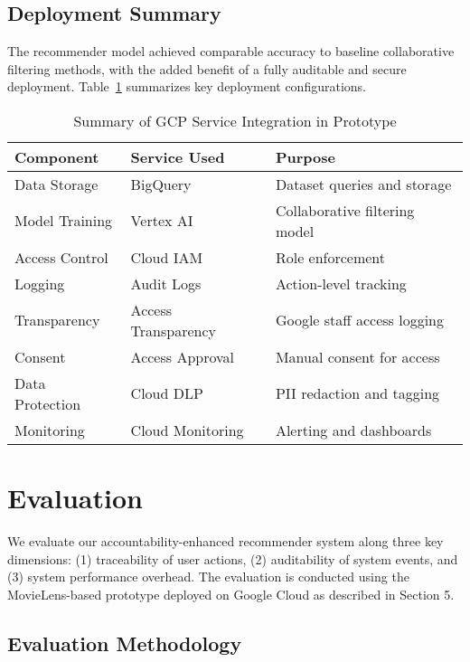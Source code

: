 \documentclass[acmsmall]{acmart}
\begin{document}
\subsection{Deployment Summary}

The recommender model achieved comparable accuracy to baseline collaborative filtering methods, with the added benefit of a fully auditable and secure deployment. Table~\ref{tab:deployment_summary} summarizes key deployment configurations.

\begin{table}[h]
\centering
\caption{Summary of GCP Service Integration in Prototype}
\label{tab:deployment_summary}
\begin{tabular}{|l|l|l|}
\hline
\textbf{Component} & \textbf{Service Used} & \textbf{Purpose} \\
\hline
Data Storage & BigQuery \cite{gcp_bigquery}& Dataset queries and storage \\
Model Training & Vertex AI \cite{gcp_vertexai}& Collaborative filtering model \\
Access Control & Cloud IAM & Role enforcement \\
Logging & Audit Logs & Action-level tracking \\
Transparency & Access Transparency & Google staff access logging \\
Consent & Access Approval & Manual consent for access \\
Data Protection & Cloud DLP & PII redaction and tagging \\
Monitoring & Cloud Monitoring\cite{gcp_monitoring} & Alerting and dashboards \\
\hline
\end{tabular}
\end{table}

\section{Evaluation}

We evaluate our accountability-enhanced recommender system along three key dimensions: (1) traceability of user actions, (2) auditability of system events, and (3) system performance overhead. The evaluation is conducted using the MovieLens-based prototype deployed on Google Cloud as described in Section 5.

\subsection{Evaluation Methodology}
\end{document}
